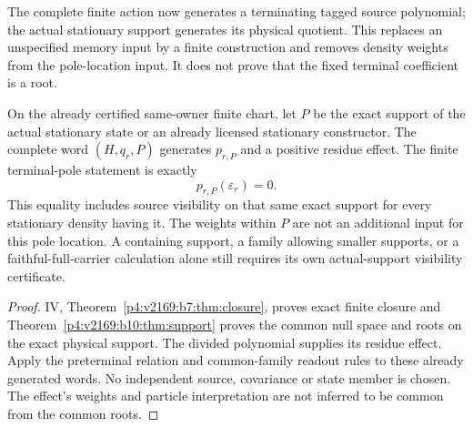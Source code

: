 \documentclass[12pt,a4paper]{article}
\begin{document}
The complete finite action now generates a terminating tagged source
polynomial; the actual stationary support generates its physical quotient.
This replaces an unspecified memory input by a finite construction and
removes density weights from the pole-location input. It does not prove
that the fixed terminal coefficient is a root.

\begin{corollary}
\label{p2a:cor:v2169-actual-support-reuse}
On the already certified same-owner finite chart, let $P$ be the exact
support of the actual stationary state or an already licensed stationary
constructor. The complete word $(H,q_r,P)$ generates $p_{r,P}$ and a
positive residue effect. The finite terminal-pole statement is exactly
\[
 \boxed{p_{r,P}(\varepsilon_r)=0.}
\]
This equality includes source visibility on that same exact support for
every stationary density having it. The weights within $P$ are not an
additional input for this pole location. A containing support, a family
allowing smaller supports, or a faithful-full-carrier calculation alone
still requires its own actual-support visibility certificate.
\end{corollary}
\begin{proof}
IV, Theorem~\ref{p4:v2169:b7:thm:closure}, proves exact finite closure and
Theorem~\ref{p4:v2169:b10:thm:support} proves the common null space and roots
on the exact physical support. The divided polynomial supplies its residue
effect. Apply the preterminal relation and common-family readout rules to
these already generated words. No independent source, covariance or state
member is chosen. The effect's weights and particle interpretation are not
inferred to be common from the common roots.
\end{proof}
\end{document}

